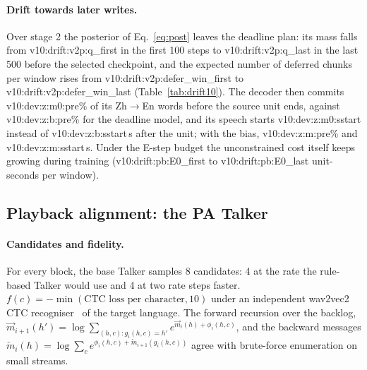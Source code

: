 

\paragraph{Drift towards later writes.} Over stage 2 the posterior of Eq.~\eqref{eq:post} leaves the deadline plan: its
mass falls from \num{v10:drift:v2p:q_first} in the first 100 steps to \num{v10:drift:v2p:q_last} in the last 500 before
the selected checkpoint, and the expected number of deferred chunks per window rises from
\num{v10:drift:v2p:defer_win_first} to \num{v10:drift:v2p:defer_win_last} (Table~\ref{tab:drift10}). The decoder then
commits \num{v10:dev:z:m0:pre}\% of its Zh$\rightarrow$En words before the source unit ends, against
\num{v10:dev:z:b:pre}\% for the deadline model, and its speech starts \num{v10:dev:z:m0:sstart} instead of
\num{v10:dev:z:b:sstart}\,s after the unit; with the bias, \num{v10:dev:z:m:pre}\% and \num{v10:dev:z:m:sstart}\,s.
Under the E-step budget the unconstrained cost itself keeps growing during training (\num{v10:drift:pb:E0_first} to
\num{v10:drift:pb:E0_last} unit-seconds per window).

\subsection{Playback alignment: the PA Talker}
\label{app:plem}

\paragraph{Candidates and fidelity.} For every block, the base Talker samples 8 candidates: 4 at the rate the
rule-based Talker would use and 4 at two rate steps faster. $f(c)=-\min(\text{CTC loss per character},10)$ under an
independent wav2vec2 CTC recogniser~\citep{baevski2020wav2vec} of the target language. The forward recursion over the
backlog, $\overrightarrow{m}_{i+1}(h')=\log\sum_{(h,c):g_i(h,c)=h'}e^{\overrightarrow{m}_i(h)+\phi_i(h,c)}$, and the backward messages
$\overleftarrow{m}_i(h)=\log\sum_c e^{\phi_i(h,c)+\overleftarrow{m}_{i+1}(g_i(h,c))}$ agree with brute-force enumeration on small streams.

